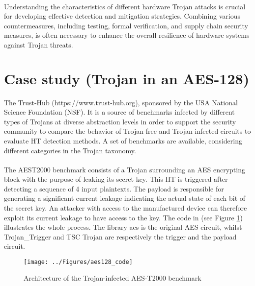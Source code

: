  \paragraph*{}
 Understanding the characteristics of different hardware Trojan attacks is crucial for developing effective detection and mitigation strategies. Combining various countermeasures, including testing, formal verification, and supply chain security measures, is often necessary to enhance the overall resilience of hardware systems against Trojan threats.
 
 \section{Case study (Trojan in an AES-128)}
 \paragraph*{}
 The Trust-Hub (https://www.trust-hub.org), sponsored by the USA National Science Foundation (NSF). It is a source of benchmarks infected by different types of Trojans at diverse abstraction levels in order to support the security community to compare the behavior of Trojan-free and Trojan-infected circuits to evaluate HT detection methods. A set of benchmarks are available, considering different categories in the Trojan taxonomy.
 \paragraph*{}
 The AES\-T2000 benchmark consists of a Trojan surrounding an AES encrypting block with the purpose of leaking its secret key. This HT is triggered after detecting a sequence of 4 input plaintexts. The payload is responsible for generating a significant current leakage indicating the actual state of each bit of the secret key. An attacker with access to the manufactured device can therefore exploit its current leakage to have access to the key. The code in (see Figure \ref{fig:aes128code}) illustrates the whole process. The library aes is the original AES circuit, whilst Trojan\_Trigger and TSC Trojan are respectively the trigger and the payload circuit.
 
 \begin{figure}
 	\centering
 	\texttt{[image: ../Figures/aes128\_code]}
 	\caption{Architecture of the Trojan-infected AES-T2000 benchmark}
 	\label{fig:aes128code}
 \end{figure}
